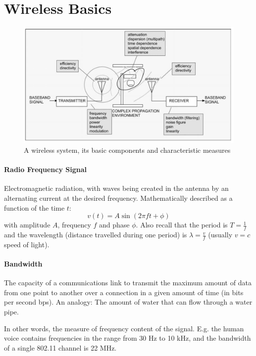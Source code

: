 \section{Wireless Basics}

\begin{figure}[h]
	\centering
	\includegraphics[scale=0.4]{images/1-wireless-system.png}
	\caption{A wireless system, its basic components and characteristic measures}
	\label{fig:wireless-system}
\end{figure}

\paragraph{Radio Frequency Signal}
Electromagnetic radiation, with waves being created in the antenna by an alternating current at the desired frequency.
Mathematically described as a function of the time $t$:
$$ v(t) = A \sin (2 \pi f t + \phi) $$
with amplitude $A$, frequency $f$ and phase $\phi$.
Also recall that the period is $T = \frac{1}{f}$ and the wavelength (distance travelled during one period) is $\lambda = \frac{v}{f}$ (usually $v=c$ speed of light).

\paragraph{Bandwidth}
The capacity of a communications link to transmit the maximum amount of data from one point to another over a connection in a given amount of time (in bits per second bps). 
An analogy: The amount of water that can flow through a water pipe.

In other words, the measure of frequency content of the signal.
E.g. the human voice contains frequencies in the range from 30 Hz to 10 kHz, and the bandwidth of a single 802.11 channel is 22 MHz.

